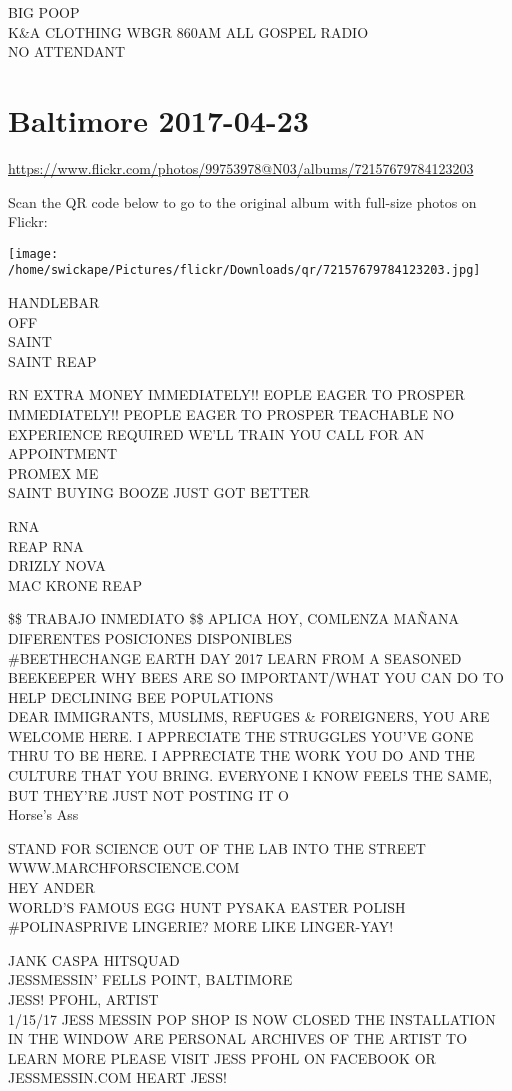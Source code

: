 \documentclass[10pt,letterpaper]{article}
\begin{document}
BIG POOP\\
K\&A CLOTHING WBGR 860AM ALL GOSPEL RADIO\\
NO ATTENDANT


\section*{Baltimore 2017-04-23}

\url{https://www.flickr.com/photos/99753978@N03/albums/72157679784123203}

Scan the QR code below to go to the original album with full-size photos on Flickr:

\texttt{[image: /home/swickape/Pictures/flickr/Downloads/qr/72157679784123203.jpg]}


HANDLEBAR\\
OFF\\
SAINT\\
SAINT REAP

RN EXTRA MONEY IMMEDIATELY!! EOPLE EAGER TO PROSPER\\
IMMEDIATELY!!  PEOPLE EAGER TO PROSPER TEACHABLE NO EXPERIENCE REQUIRED WE'LL TRAIN YOU CALL FOR AN APPOINTMENT\\
PROMEX ME\\
SAINT BUYING BOOZE JUST GOT BETTER

RNA\\
REAP RNA\\
DRIZLY NOVA\\
MAC KRONE REAP

\$\$ TRABAJO INMEDIATO \$\$ APLICA HOY, COMLENZA MAÑANA DIFERENTES POSICIONES DISPONIBLES\\
\#BEETHECHANGE EARTH DAY 2017 LEARN FROM A SEASONED BEEKEEPER WHY BEES ARE SO IMPORTANT/WHAT YOU CAN DO TO HELP DECLINING BEE POPULATIONS\\
DEAR IMMIGRANTS, MUSLIMS, REFUGES \& FOREIGNERS, YOU ARE WELCOME HERE.  I APPRECIATE THE STRUGGLES YOU'VE GONE THRU TO BE HERE.  I APPRECIATE THE WORK YOU DO AND THE CULTURE THAT YOU BRING.  EVERYONE I KNOW FEELS THE SAME, BUT THEY'RE JUST NOT POSTING IT O\\
Horse's Ass

STAND FOR SCIENCE OUT OF THE LAB INTO THE STREET WWW.MARCHFORSCIENCE.COM\\
HEY ANDER\\
WORLD'S FAMOUS EGG HUNT PYSAKA EASTER POLISH\\
\#POLINASPRIVE LINGERIE? MORE LIKE LINGER{-}YAY!

JANK CASPA HITSQUAD\\
JESSMESSIN' FELLS POINT, BALTIMORE\\
JESS! PFOHL, ARTIST\\
1/15/17 JESS MESSIN POP SHOP IS NOW CLOSED THE INSTALLATION IN THE WINDOW ARE PERSONAL ARCHIVES OF THE ARTIST TO LEARN MORE PLEASE VISIT JESS PFOHL ON FACEBOOK OR JESSMESSIN.COM HEART JESS!
\end{document}

